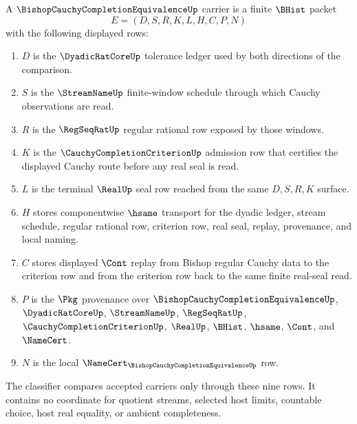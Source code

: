 \begin{definition}
\label{def:bishop-cauchy-completion-equivalence-carrier}
A $\BishopCauchyCompletionEquivalenceUp$ carrier is a finite $\BHist$ packet
$$
E=(D,S,R,K,L,H,C,P,N)
$$
with the following displayed rows:
\begin{enumerate}
\item $D$ is the $\DyadicRatCoreUp$ tolerance ledger used by both directions of the comparison.
\item $S$ is the $\StreamNameUp$ finite-window schedule through which Cauchy observations are read.
\item $R$ is the $\RegSeqRatUp$ regular rational row exposed by those windows.
\item $K$ is the $\CauchyCompletionCriterionUp$ admission row that certifies the displayed Cauchy route before any real seal is read.
\item $L$ is the terminal $\RealUp$ seal row reached from the same $D,S,R,K$ surface.
\item $H$ stores componentwise $\hsame$ transport for the dyadic ledger, stream schedule, regular rational row, criterion row, real seal, replay, provenance, and local naming.
\item $C$ stores displayed $\Cont$ replay from Bishop regular Cauchy data to the criterion row and from the criterion row back to the same finite real-seal read.
\item $P$ is the $\Pkg$ provenance over $\BishopCauchyCompletionEquivalenceUp$, $\DyadicRatCoreUp$, $\StreamNameUp$, $\RegSeqRatUp$, $\CauchyCompletionCriterionUp$, $\RealUp$, $\BHist$, $\hsame$, $\Cont$, and $\NameCert$.
\item $N$ is the local $\NameCert_{\BishopCauchyCompletionEquivalenceUp}$ row.
\end{enumerate}
The classifier compares accepted carriers only through these nine rows. It contains no coordinate for quotient streams, selected host limits, countable choice, host real equality, or ambient completeness.
\end{definition}


